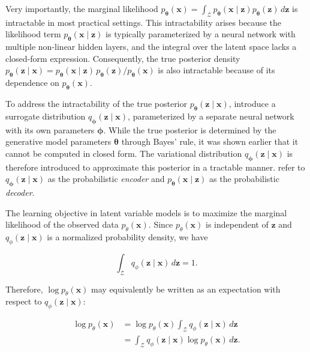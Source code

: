 \documentclass[10pt,twocolumn,article]{memoir}
\begin{document}
Very importantly, the marginal likelihood $p_{\boldsymbol{\theta}}(\mathbf{x}) = \int_{\mathcal{Z}} p_{\boldsymbol{\theta}}(\mathbf{x} \mid \mathbf{z}) p_{\boldsymbol{\theta}}(\mathbf{z}) \, d\mathbf{z}$ is intractable in most practical settings. This intractability arises because the likelihood term $p_{\boldsymbol{\theta}}(\mathbf{x} \mid \mathbf{z})$ is typically parameterized by a neural network with multiple non-linear hidden layers, and the integral over the latent space lacks a closed-form expression. Consequently, the true posterior density $p_{\boldsymbol{\theta}}(\mathbf{z} \mid \mathbf{x}) = p_{\boldsymbol{\theta}}(\mathbf{x} \mid \mathbf{z}) \, p_{\boldsymbol{\theta}}(\mathbf{z}) / p_{\boldsymbol{\theta}}(\mathbf{x})$ is also intractable because of its dependence on $p_{\boldsymbol{\theta}}(\mathbf{x})$.

To address the intractability of the true posterior $p_{\boldsymbol{\theta}}(\mathbf{z} \mid \mathbf{x})$, \textcite{kingma2013auto} introduce a surrogate distribution $q_{\boldsymbol{\phi}}(\mathbf{z} \mid \mathbf{x})$, parameterized by a separate neural network with its own parameters $\boldsymbol{\phi}$. While the true posterior is determined by the generative model parameters $\boldsymbol{\theta}$ through Bayes' rule, it was shown earlier  that it cannot be computed in closed form. The variational distribution $q_{\boldsymbol{\phi}}(\mathbf{z} \mid \mathbf{x})$ is therefore introduced to approximate this posterior in a tractable manner. \textcite{kingma2013auto} refer to $q_{\boldsymbol{\phi}}(\mathbf{z} \mid \mathbf{x})$ as the probabilistic \textit{encoder} and $p_{\boldsymbol{\theta}}(\mathbf{x} \mid \mathbf{z})$ as the probabilistic \textit{decoder}.

The learning objective in latent variable models is to maximize the marginal
likelihood of the observed data $p_\theta(\mathbf{x})$. Since
$p_\theta(\mathbf{x})$ is independent of $\mathbf{z}$ and
$q_\phi(\mathbf{z}\mid\mathbf{x})$ is a normalized probability density,
we have

\begin{equation}
\int_{\mathcal{Z}}
q_\phi(\mathbf{z}\mid\mathbf{x})\,d\mathbf{z}
= 1.
\end{equation}

Therefore, $\log p_\theta(\mathbf{x})$ may equivalently be written as an
expectation with respect to $q_\phi(\mathbf{z}\mid\mathbf{x})$:

\begin{equation}
\begin{aligned}
\log p_\theta(\mathbf{x})
&=
\log p_\theta(\mathbf{x})
\int_{\mathcal{Z}}
q_\phi(\mathbf{z}\mid\mathbf{x})\,d\mathbf{z} \\
&=
\int_{\mathcal{Z}}
q_\phi(\mathbf{z}\mid\mathbf{x})
\log p_\theta(\mathbf{x})\,d\mathbf{z}.
\end{aligned}
\end{equation}
\end{document}
